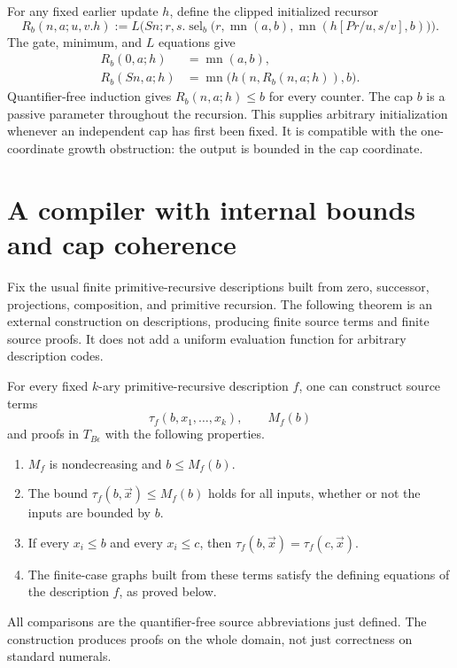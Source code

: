 For any fixed earlier update $h$, define the clipped initialized recursor
\[
 R_b(n,a;u,v.h):=
 L\bigl(Sn;r,s.
 \operatorname{sel}_b\bigl(r,\operatorname{mn}(a,b),
        \operatorname{mn}(h[Pr/u,s/v],b)\bigr)\bigr).
 \tag{Clipped recursion}\label{eq:ib-clipped-recursion}
\]
The gate, minimum, and $L$ equations give
\begin{align}
 R_b(0,a;h)&=\operatorname{mn}(a,b),\label{eq:ib-R0}\\
 R_b(Sn,a;h)&=
 \operatorname{mn}\bigl(h(n,R_b(n,a;h)),b\bigr).
 \label{eq:ib-RS}
\end{align}
Quantifier-free induction gives $R_b(n,a;h)\leq b$ for every counter.
The cap $b$ is a passive parameter throughout the recursion.
This supplies arbitrary initialization whenever an independent cap
has first been fixed.  It is compatible with the one-coordinate growth
obstruction: the output is bounded in the cap coordinate.

\section{A compiler with internal bounds and cap coherence}
\label{sec:internal-compiler}

Fix the usual finite primitive-recursive descriptions built from zero,
successor, projections, composition, and primitive recursion.  The
following theorem is an external construction on descriptions, producing
finite source terms and finite source proofs.  It does not add a uniform
evaluation function for arbitrary description codes.

\begin{theorem}
\label{thm:internal-bounded-realization}
For every fixed $k$-ary primitive-recursive description $f$, one can
construct source terms
\[
                     \tau_f(b,x_1,\ldots,x_k),\qquad M_f(b)
\]
and proofs in $T_{B\epsilon}$ with the following properties.
\begin{enumerate}
\item $M_f$ is nondecreasing and $b\leq M_f(b)$.
\item The bound $\tau_f(b,\vec x)\leq M_f(b)$ holds for all inputs,
      whether or not the inputs are bounded by $b$.
\item If every $x_i\leq b$ and every $x_i\leq c$, then
      $\tau_f(b,\vec x)=\tau_f(c,\vec x)$.
\item The finite-case graphs built from these terms satisfy the defining
      equations of the description $f$, as proved below.
\end{enumerate}
All comparisons are the quantifier-free source abbreviations just
defined.  The construction produces proofs on the whole domain,
not just correctness on standard numerals.
\end{theorem}

